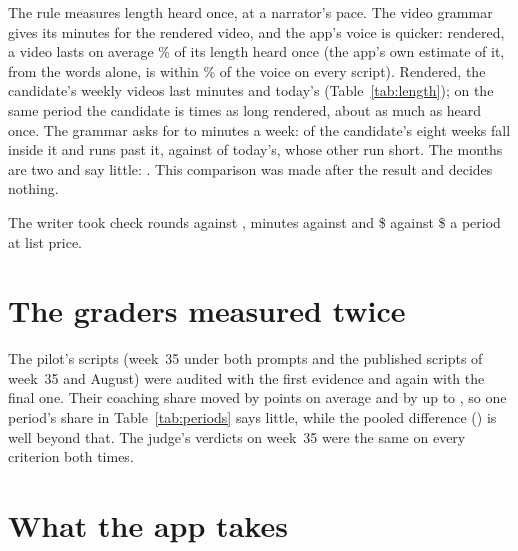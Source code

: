 \documentclass[11pt]{article}
\begin{document}
The rule measures length heard once, at a narrator's pace. The video grammar gives its minutes for
the rendered video, and the app's voice is quicker: rendered, a video lasts on average
\RenderedShare\% of its length heard once (the app's own estimate of it, from the words alone, is
within \EstimateOff\% of the voice on every script). Rendered, the candidate's weekly videos last
\CandWeekRendered{} minutes and today's \BaseWeekRendered{} (Table~\ref{tab:length}); on the same
period the candidate is \RenderedRatio{} times as long rendered, about as much as heard once. The
grammar asks for \WeekTargetLo{} to \WeekTargetHi{} minutes a week: \CandWeekRenderedIn{} of the
candidate's eight weeks fall inside it and \CandWeekRenderedOver{} runs past it, against
\BaseWeekRenderedIn{} of today's, whose other \BaseWeekRenderedUnder{} run short. The months are two
and say little: \MonthLengthText. This comparison was made after the result and decides nothing.

The writer took \CandRounds{} check rounds against \BaseRounds, \CandMinutes{} minutes against
\BaseMinutes{} and \$\CandCost{} against \$\BaseCost{} a period at list price.

\section{The graders measured twice}
\label{sec:twice}

The pilot's \RegradedN{} scripts (week~35 under both prompts and the published scripts of week~35
and August) were audited with the first evidence and again with the final one. Their coaching share
moved by \RegradeShare{} points on average and by up to \RegradeMax, so one period's share in
Table~\ref{tab:periods} says little, while the pooled difference (\ShareDiff) is well beyond that.
The judge's verdicts on week~35 were the same on every criterion both times.

\begin{table}[h]
\centering
\scriptsize\PeriodTable
\caption{Each period: the judge's verdict from the candidate's side ($+$ a win, $-$ a loss, $0$ a
tie), the minutes heard once under each prompt, and the share of the coaching moves the audit finds
in the moment scenes.}
\label{tab:periods}
\end{table}

\section{What the app takes}
\end{document}
